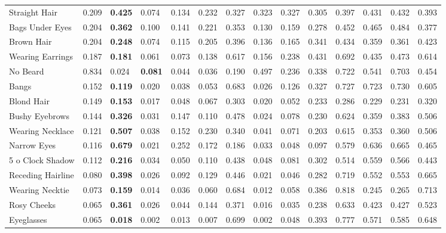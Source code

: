 \begin{tabular}{lrllrrrrrrrrrr}
 Straight Hair       & 0.209 & \bf 0.425 & 0.074     & 0.134 & 0.232 & 0.327 & 0.323 & 0.327 & 0.305 & 0.397 & 0.431 & 0.432 & 0.393 \\
 Bags Under Eyes     & 0.204 & \bf 0.362 & 0.100     & 0.141 & 0.221 & 0.353 & 0.130 & 0.159 & 0.278 & 0.452 & 0.465 & 0.484 & 0.377 \\
 Brown Hair          & 0.204 & \bf 0.248 & 0.074     & 0.115 & 0.205 & 0.396 & 0.136 & 0.165 & 0.341 & 0.434 & 0.359 & 0.361 & 0.423 \\
 Wearing Earrings    & 0.187 & \bf 0.181 & 0.061     & 0.073 & 0.138 & 0.617 & 0.156 & 0.238 & 0.431 & 0.692 & 0.435 & 0.473 & 0.614 \\
 No Beard            & 0.834 & 0.024     & \bf 0.081 & 0.044 & 0.036 & 0.190 & 0.497 & 0.236 & 0.338 & 0.722 & 0.541 & 0.703 & 0.454 \\
 Bangs               & 0.152 & \bf 0.119 & 0.020     & 0.038 & 0.053 & 0.683 & 0.026 & 0.126 & 0.327 & 0.727 & 0.723 & 0.730 & 0.605 \\
 Blond Hair          & 0.149 & \bf 0.153 & 0.017     & 0.048 & 0.067 & 0.303 & 0.020 & 0.052 & 0.233 & 0.286 & 0.229 & 0.231 & 0.320 \\
 Bushy Eyebrows      & 0.144 & \bf 0.326 & 0.031     & 0.147 & 0.110 & 0.478 & 0.024 & 0.078 & 0.230 & 0.624 & 0.359 & 0.383 & 0.506 \\
 Wearing Necklace    & 0.121 & \bf 0.507 & 0.038     & 0.152 & 0.230 & 0.340 & 0.041 & 0.071 & 0.203 & 0.615 & 0.353 & 0.360 & 0.506 \\
 Narrow Eyes         & 0.116 & \bf 0.679 & 0.021     & 0.252 & 0.172 & 0.186 & 0.033 & 0.048 & 0.097 & 0.579 & 0.636 & 0.665 & 0.465 \\
 5 o Clock Shadow    & 0.112 & \bf 0.216 & 0.034     & 0.050 & 0.110 & 0.438 & 0.048 & 0.081 & 0.302 & 0.514 & 0.559 & 0.566 & 0.443 \\
 Receding Hairline   & 0.080 & \bf 0.398 & 0.026     & 0.092 & 0.129 & 0.446 & 0.021 & 0.046 & 0.282 & 0.719 & 0.552 & 0.553 & 0.665 \\
 Wearing Necktie     & 0.073 & \bf 0.159 & 0.014     & 0.036 & 0.060 & 0.684 & 0.012 & 0.058 & 0.386 & 0.818 & 0.245 & 0.265 & 0.713 \\
 Rosy Cheeks         & 0.065 & \bf 0.361 & 0.026     & 0.044 & 0.144 & 0.371 & 0.016 & 0.035 & 0.238 & 0.633 & 0.423 & 0.427 & 0.523 \\
 Eyeglasses          & 0.065 & \bf 0.018 & 0.002     & 0.013 & 0.007 & 0.699 & 0.002 & 0.048 & 0.393 & 0.777 & 0.571 & 0.585 & 0.648 \\

\end{tabular}
